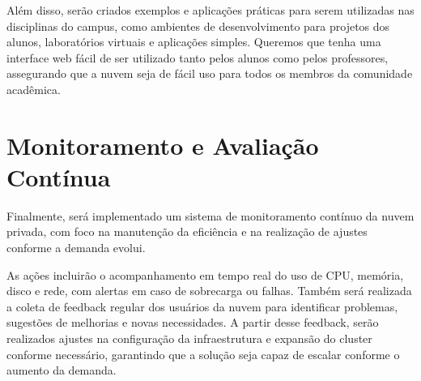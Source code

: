 Além disso, serão criados exemplos e aplicações práticas para serem utilizadas nas disciplinas do campus, como ambientes de desenvolvimento para projetos dos alunos, laboratórios virtuais e aplicações simples. Queremos que tenha uma interface web fácil de ser utilizado tanto pelos alunos como pelos professores, assegurando que a nuvem seja de fácil uso para todos os membros da comunidade acadêmica.

\section{Monitoramento e Avaliação Contínua}

Finalmente, será implementado um sistema de monitoramento contínuo da nuvem privada, com foco na manutenção da eficiência e na realização de ajustes conforme a demanda evolui.

As ações incluirão o acompanhamento em tempo real do uso de CPU, memória, disco e rede, com alertas em caso de sobrecarga ou falhas. Também será realizada a coleta de feedback regular dos usuários da nuvem para identificar problemas, sugestões de melhorias e novas necessidades. A partir desse feedback, serão realizados ajustes na configuração da infraestrutura e expansão do cluster conforme necessário, garantindo que a solução seja capaz de escalar conforme o aumento da demanda.
